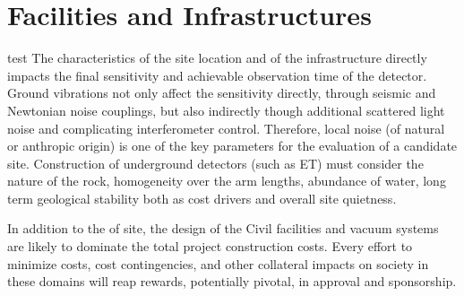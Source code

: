 \chapter{Facilities and Infrastructures}
\label{sec:Fac_Inf}
test
The characteristics of the site location and of the infrastructure directly impacts the final sensitivity and achievable observation time of the detector. Ground vibrations not only affect the sensitivity directly, through seismic and Newtonian noise couplings, but 
also indirectly though additional scattered light noise and 
complicating interferometer control.
Therefore, local noise (of natural or anthropic origin) is one of the key parameters for the evaluation of a candidate site.  Construction of underground detectors (such as ET) must consider the nature of the rock, homogeneity over the arm lengths, abundance of water, long term geological stability both as cost drivers and overall site quietness. 

In addition to the of site, the design of the 
Civil facilities and vacuum systems are likely to dominate the total project construction costs.  Every effort to minimize costs, cost %
contingencies, and other collateral impacts on society in these domains will reap rewards,  potentially pivotal, in approval and sponsorship. 

